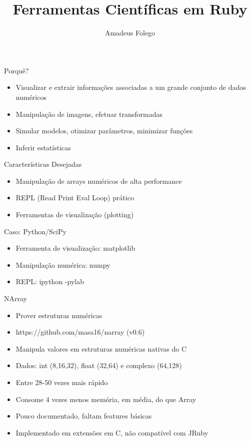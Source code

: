 \documentclass{beamer}
\author{Amadeus Folego}
\title{Ferramentas Científicas em Ruby}
\date{}
\institute{
  \begin{tabular}{c c}
    {\em email} & \url{amadeusfolego[at]gmail[dot]com}\\
    {\em github} & \url{@badosu}\\
    {\em twitter} & \url{@badosu\_}
  \end{tabular}
}
\begin{document}
  \frame[plain]{\titlepage}
  \begin{frame}{Porquê?}
    \begin{itemize}
      \item Visualizar e extrair informações associadas a um grande conjunto de dados numéricos \pause
      \item Manipulação de imagens, efetuar transformadas \pause
      \item Simular modelos, otimizar parâmetros, minimizar funções \pause
      \item Inferir estatísticas
    \end{itemize}
  \end{frame}
  \begin{frame}{Características Desejadas}
    \begin{itemize}
      \item Manipulação de arrays numéricos de alta performance \pause
      \item REPL (Read Print Eval Loop) prático \pause
      \item Ferramentas de visualização (plotting)
    \end{itemize}
  \end{frame}
  \begin{frame}{Caso: Python/SciPy}
    \begin{itemize}
      \item Ferramenta de visualização: matplotlib \pause
      \item Manipulação numérica: numpy \pause
      \item REPL: ipython -pylab
    \end{itemize}
  \end{frame}
  \begin{frame}[fragile]{NArray}
    \begin{itemize}
      \item Prover estruturas numéricas \pause
      \item https://github.com/masa16/narray (v0.6) \pause
      \item Manipula valores em estruturas numéricas nativas do C \pause
      \item Dados: int (8,16,32), float (32,64) e complexo (64,128) \pause
      \item Entre 28-50 vezes mais rápido \pause
      \item Consome 4 vezes menos memória, em média, do que Array \pause
      \item Pouco documentado, faltam features básicas \pause
      \item Implementado em extensões em C, não compatível com JRuby
    \end{itemize}
\end{frame}
\end{document}
